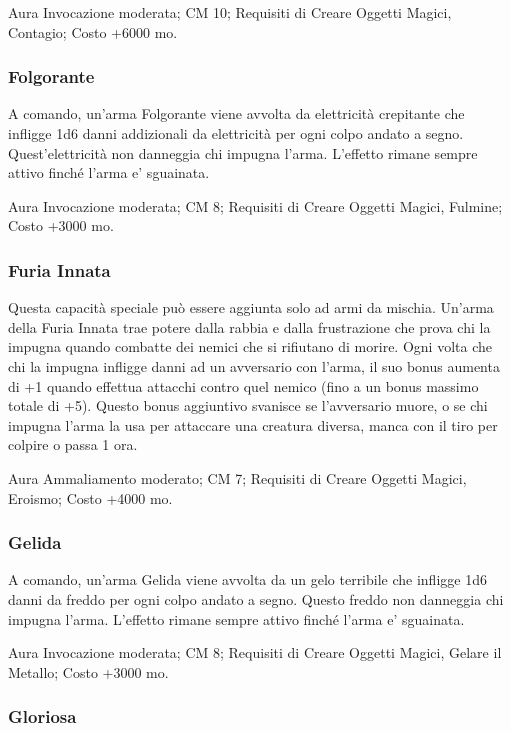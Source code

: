 \begin{multicols}{2}
Aura Invocazione moderata; CM 10; Requisiti di Creare Oggetti Magici, Contagio; Costo +6000 mo.

\subsubsection{Folgorante}

A comando, un'arma Folgorante viene avvolta da elettricità crepitante che infligge 1d6 danni addizionali da elettricità per ogni colpo andato a segno. Quest'elettricità non danneggia chi impugna l'arma. L'effetto rimane sempre attivo finché l'arma e' sguainata.

Aura Invocazione moderata; CM 8; Requisiti di Creare Oggetti Magici, Fulmine; Costo +3000 mo.

\subsubsection{Furia Innata}

Questa capacità speciale può essere aggiunta solo ad armi da mischia. Un'arma della Furia Innata trae potere dalla rabbia e dalla frustrazione che prova chi la impugna quando combatte dei nemici che si rifiutano di morire. Ogni volta che chi la impugna infligge danni ad un avversario con l'arma, il suo bonus aumenta di +1 quando effettua attacchi contro quel nemico (fino a un bonus massimo totale di +5). Questo bonus aggiuntivo svanisce se l'avversario muore, o se chi impugna l'arma la usa per attaccare una creatura diversa, manca con il tiro per colpire o passa 1 ora.

Aura Ammaliamento moderato; CM 7; Requisiti di Creare Oggetti Magici, Eroismo; Costo +4000 mo.

\subsubsection{Gelida}

A comando, un'arma Gelida viene avvolta da un gelo terribile che infligge 1d6 danni da freddo per ogni colpo andato a segno. Questo freddo non danneggia chi impugna l'arma. L'effetto rimane sempre attivo finché l'arma e' sguainata.

Aura Invocazione moderata; CM 8; Requisiti di Creare Oggetti Magici, Gelare il Metallo; Costo +3000 mo.

\subsubsection{Gloriosa}


\end{multicols}
